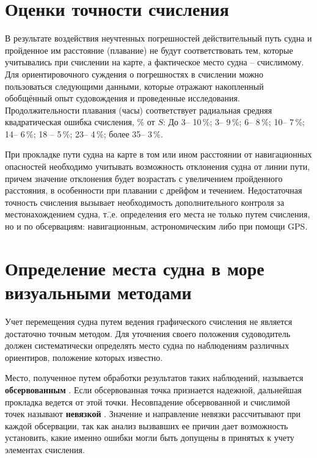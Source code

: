 \section{Оценки точности счисления}

В результате воздействия неучтенных погрешностей действительный путь
судна и пройденное им расстояние (плавание) не будут соответствовать
тем, которые учитывались при счислении на карте, а фактическое место
судна \--- счислимому. Для ориентировочного суждения о погрешностях в
счислении можно пользоваться следующими данными, которые отражают
накопленный обобщённый опыт судовождения и проведенные
исследования. Продолжительности плавания (часы) соответствует
радиальная средняя квадратическая ошибка счисления, \% от $S$: До
3\thr \--- 10\,\%; 3\thr \--- 9\,\%; 6\thr \--- 8\,\%;
10\thr \--- 7\,\%; 14\thr \--- 6\,\%; 18\thr
\--- 5\,\%; 23\thr \--- 4\,\%; более 35\thr \--- 3\,\%.

При прокладке пути судна на карте в том или ином расстоянии от
навигационных опасностей необходимо учитывать возможность отклонения
судна от линии пути, причем значение отклонения будет возрастать с
увеличением пройденного расстояния, в особенности при плавании с
дрейфом и течением. Недостаточная точность счисления вызывает
необходимость дополнительного контроля за местонахождением судна,
т.\=,е. определения его места не только путем счисления, но и по
обсервациям: навигационным, астрономическим либо при помощи GPS.

\section{Определение места судна в море визуальными методами}

Учет перемещения судна путем ведения графического счисления не
является достаточно точным методом. Для уточнения своего положения
судоводитель должен систематически определять место судна по
наблюдениям различных ориентиров, положение которых известно.

Место, полученное путем обработки результатов таких наблюдений,
называется \textbf{обсервованным} . Если
обсервованная точка признается надежной, дальнейшая прокладка ведется
от этой точки. Несовпадение обсервованной и счислимой точек называют
\textbf{невязкой} . Значение и направление невязки
рассчитывают при каждой обсервации, так как анализ вызвавших ее причин
дает возможность установить, какие именно ошибки могли быть допущены в
принятых к учету элементах счисления.


